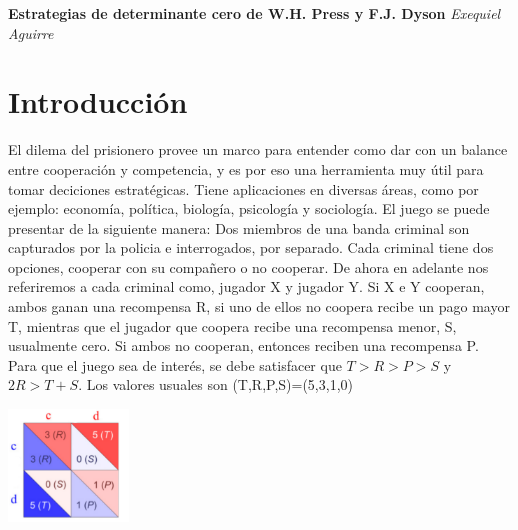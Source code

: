 \documentclass[11pt]{article}
\begin{document}
\begin{center}
{ \LARGE \bf Estrategias de determinante cero de W.H. Press y F.J. Dyson}
\vskip 0.25cm
{\it Exequiel Aguirre}

\end{center}


\begin{abstract}
El juego del dilema del prisionero, en su versión de dos jugadores, puede ser usado como modelo para 
muchas situaciones del mundo real, que involucran cooperativismo y competencia. Se asume en general, que no hay 
una estrategia donde, unilateralmente, se pueda forzar a recibir una recompensa injusta.\newline
En un artículo publicado por W.H. Press y F.J. Dyson, se muestra que existen estrategias con esa característica.
Con dichas estrategias, un jugador puede forzar el puntaje del oponente o establecer una relación lineal entre
el puntaje propio y el del oponente.\newline
En este trabajo, se pretende explicar lo expuesto en el paper original de W.H. Press y F.J. Dyson, completando
algunos cálculos y aplicarlos en una simulación.
\end{abstract}




\section{Introducción}
El dilema del prisionero provee un  marco para entender como dar con un balance entre cooperación y competencia, y es
por eso una herramienta muy útil para tomar deciciones estratégicas.
Tiene aplicaciones en diversas áreas, como por ejemplo: economía, política, biología, psicología y sociología.\newline
El juego se puede presentar de la siguiente manera:\newline
Dos miembros de una banda criminal son capturados por la policia e interrogados, por separado.
Cada criminal tiene dos opciones, cooperar con su compañero o no cooperar.
De ahora en adelante nos referiremos a cada criminal como, jugador X y jugador Y.
Si X e Y cooperan, ambos ganan una recompensa R, si uno de ellos no coopera recibe un pago mayor T, mientras que el
jugador que coopera recibe una recompensa menor, S, usualmente cero. Si ambos no cooperan, entonces reciben una recompensa P.
Para que el juego sea de interés, se debe satisfacer que $T >  R > P > S$ y $2R > T+S$.
Los valores usuales son (T,R,P,S)=(5,3,1,0)
\begin{center}
\includegraphics[height=3cm]{./pd.png}
\end{center}
\end{document}
